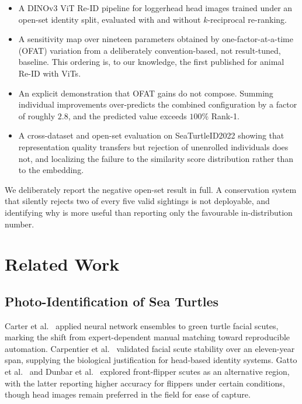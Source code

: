 \documentclass[conference]{IEEEtran}
\begin{document}
\begin{itemize}
  \item A DINOv3 ViT Re-ID pipeline for loggerhead head images trained under an open-set
        identity split, evaluated with and without $k$-reciprocal re-ranking.
  \item A sensitivity map over nineteen parameters obtained by one-factor-at-a-time
        (OFAT) variation from a deliberately convention-based, not result-tuned, baseline.
        This ordering is, to our knowledge, the first published for animal Re-ID with ViTs.
  \item An explicit demonstration that OFAT gains do not compose. Summing individual
        improvements over-predicts the combined configuration by a factor of roughly $2.8$,
        and the predicted value exceeds $100\%$ Rank-1.
  \item A cross-dataset and open-set evaluation on SeaTurtleID2022 showing that
        representation quality transfers but rejection of unenrolled individuals does not, and
        localizing the failure to the similarity score distribution rather than to the
        embedding.
\end{itemize}

We deliberately report the negative open-set result in full. A conservation system that
silently rejects two of every five valid sightings is not deployable, and identifying
why is more useful than reporting only the favourable in-distribution number.

\section{Related Work}

\subsection{Photo-Identification of Sea Turtles}

Carter et al.\ \cite{carter2014} applied neural network ensembles to green turtle
facial scutes, marking the shift from expert-dependent manual matching toward
reproducible automation. Carpentier et al.\ \cite{carpentier2016} validated facial
scute stability over an eleven-year span, supplying the biological justification for
head-based identity systems. Gatto et al.\ \cite{gatto2018} and Dunbar et al.\
\cite{dunbar2023} explored front-flipper scutes as an alternative region, with the
latter reporting higher accuracy for flippers under certain conditions, though head
images remain preferred in the field for ease of capture.
\end{document}
